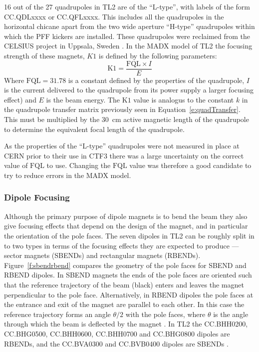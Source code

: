 16 out of the 27 quadrupoles in TL2 are of the ``L-type'', with labels of the form CC.QDLxxxx or CC.QFLxxxx. This includes all the quadrupoles in the horizontal chicane apart from the two wide aperture ``H-type'' quadrupoles within which the PFF kickers are installed. These quadrupoles were reclaimed from the CELSIUS project in Uppsala, Sweden \cite{celsius}. In the MADX model of TL2 the focusing strength of these magnets, \(K1\) is defined by the following parameters:
\begin{equation}
\mathrm{K1} = \frac{\mathrm{FQL}\times I}{E}
\end{equation}
Where \(\mathrm{FQL} = 31.78\) is a constant defined by the properties of the quadrupole, \(I\) is the current delivered to the quadrupole from its power supply a larger focusing effect) and \(E\) is the beam energy. The \(\mathrm{K1}\) value is analogus to the constant \(k\) in the quadrupole transfer matrix previously seen in Equation~\ref{e:quadTransfer}. This must be multiplied by the 30~cm active magnetic length of the quadrupole to determine the equivalent focal length of the quadrupole.

As the properties of the ``L-type'' quadrupoles were not measured in place at CERN prior to their use in CTF3 there was a large uncertainty on the correct value of \(\mathrm{FQL}\) to use. Changing the \(\mathrm{FQL}\) value was therefore a good candidate to try to reduce errors in the MADX model.

\subsubsection{Dipole Focusing}
\label{sss:edgeFocusing}

Although the primary purpose of dipole magnets is to bend the beam they also give focusing effects that depend on the design of the magnet, and in particular the orientation of the pole faces. The seven dipoles in TL2 can be roughly split in to two types in terms of the focusing effects they are expected to produce --- sector magnets (SBENDs) and rectangular magnets (RBENDs). Figure~\ref{f:sbendrbend} compares the geometry of the pole faces for SBEND and RBEND dipoles. In SBEND magnets the ends of the pole faces are oriented such that the reference trajectory of the beam (black) enters and leaves the magnet perpendicular to the pole face. Alternatively, in RBEND dipoles the pole faces at the entrance and exit of the magnet are parallel to each other. In this case the reference trajectory forms an angle \(\theta/2\) with the pole faces, where \(\theta\) is the angle through which the beam is deflected by the magnet \cite{wiedemann}. In TL2 the CC.BHH0200, CC.BHG0500, CC.BHH0600, CC.BHH0700 and CC.BHG0800 dipoles are RBENDs, and the CC.BVA0300 and CC.BVB0400 dipoles are SBENDs \cite{tl2Magnets}.

